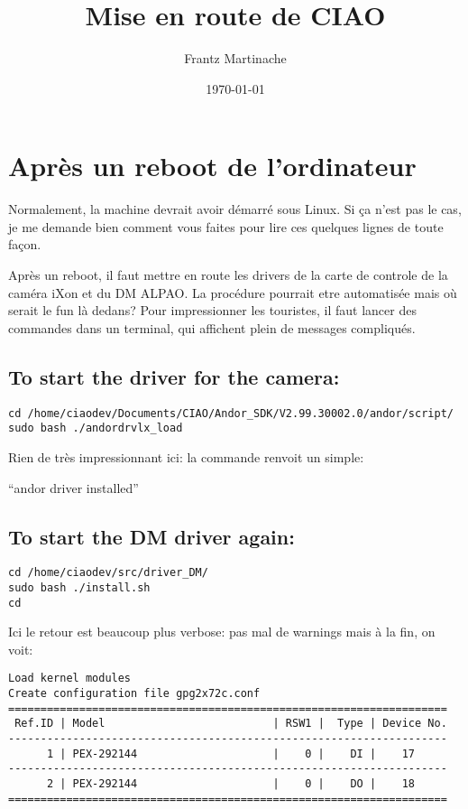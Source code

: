 \documentclass[11pt]{article}
\title{Mise en route de CIAO}
\author{Frantz Martinache}
\date{\today}
\begin{document}
\maketitle

\setcounter{tocdepth}{3}
\tableofcontents
\vspace*{1cm}

\section{Après un reboot de l'ordinateur}
\label{sec-1}


Normalement, la machine devrait avoir démarré sous Linux. Si ça n'est
pas le cas, je me demande bien comment vous faites pour lire ces
quelques lignes de toute façon.

Après un reboot, il faut mettre en route les drivers de la carte de
controle de la caméra iXon et du DM ALPAO. La procédure pourrait etre
automatisée mais où serait le fun là dedans? Pour impressionner les
touristes, il faut lancer des commandes dans un terminal, qui
affichent plein de messages compliqués.
\subsection{To start the driver for the camera:}
\label{sec-1-1}



\begin{verbatim}
cd /home/ciaodev/Documents/CIAO/Andor_SDK/V2.99.30002.0/andor/script/
sudo bash ./andordrvlx_load
\end{verbatim}

Rien de très impressionnant ici: la commande renvoit un simple:

``andor driver installed''
\subsection{To start the DM driver again:}
\label{sec-1-2}



\begin{verbatim}
cd /home/ciaodev/src/driver_DM/
sudo bash ./install.sh
cd
\end{verbatim}

Ici le retour est beaucoup plus verbose: pas mal de warnings mais à
la fin, on voit:


\begin{verbatim}
Load kernel modules
Create configuration file gpg2x72c.conf
====================================================================
 Ref.ID | Model                          | RSW1 |  Type | Device No.  
--------------------------------------------------------------------
      1 | PEX-292144                     |    0 |    DI |    17
--------------------------------------------------------------------
      2 | PEX-292144                     |    0 |    DO |    18
====================================================================
\end{verbatim}
\end{document}
